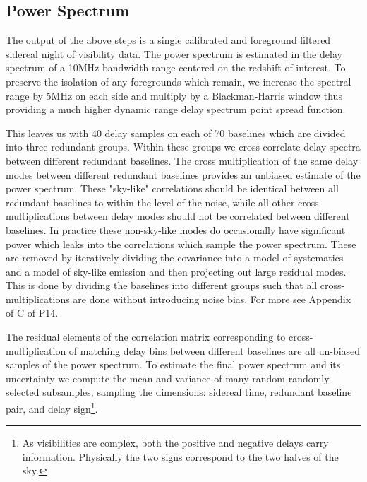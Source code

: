 \documentclass[preprint]{aastex}
\begin{document}
\subsection{Power Spectrum}
\label{sec:power_spectrum}
The output of the above steps is a single calibrated and foreground filtered sidereal night of visibility data. The power spectrum is estimated in the delay spectrum of  a 10MHz bandwidth range centered on the redshift of interest. To preserve the isolation of any foregrounds which remain, we increase the spectral range by 5MHz on each side and multiply by a Blackman-Harris window thus providing a much higher dynamic range delay spectrum point spread function. 

This leaves us with 40 delay samples on each of 70 baselines which are divided into three redundant groups. Within these groups we cross correlate delay spectra between different redundant baselines.  The cross multiplication of the same delay modes between different redundant baselines provides an unbiased estimate of the power spectrum.  These "sky-like" correlations should be identical between all redundant baselines to within the level of the noise, while all other cross multiplications between delay modes should not be correlated between different baselines. In practice  these non-sky-like modes do occasionally have significant power which leaks into the correlations which sample the power spectrum.  These are removed by iteratively dividing the covariance into a model of systematics and a model of sky-like emission and then projecting out large residual modes. This is done by dividing the baselines into different groups such that all cross-multiplications are done without introducing noise bias.  For more see Appendix of C of P14.

The residual elements of the correlation matrix corresponding to cross-multiplication of matching delay bins between different baselines are all un-biased samples of the power spectrum. To estimate the final power spectrum and its uncertainty we compute the mean and variance of many random randomly-selected subsamples, sampling the dimensions: sidereal time, redundant baseline pair, and delay sign\footnote{As visibilities are complex, both the positive and negative delays  carry  information. Physically the two signs correspond to the two halves of the sky.}.
\end{document}

